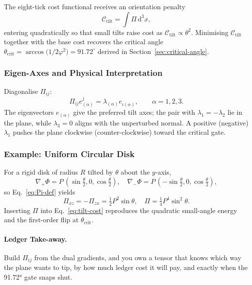 \documentclass[11pt,oneside]{book}
\begin{document}
The eight-tick cost functional receives an orientation penalty
\begin{equation}
   \mathcal C_{\text{tilt}}
   = \int\!\! \Pi\,\mathrm d^{3}x,
   \label{eq:tilt-cost}
\end{equation}
entering quadratically so that small tilts raise cost as
$\mathcal C_{\text{tilt}}\propto\theta^{2}$.
Minimising $\mathcal C_{\text{tilt}}$ together with the base cost
recovers the critical angle
$\theta_{\text{crit}} = \arccos\!\bigl(1/2\varphi^{2}\bigr)
 = 91.72^{\circ}$ derived in
Section~\ref{sec:critical-angle}.

\subsubsection{Eigen-Axes and Physical Interpretation}
\label{ss:Pi-eigen}

Diagonalise $\Pi_{ij}$:
\[
   \Pi_{ij}e^{j}_{(\alpha)} = \lambda_{(\alpha)} e^{\; }_{i(\alpha)},
   \qquad \alpha=1,2,3.
\]
The eigenvectors $e_{(\alpha)}$ give the preferred tilt axes; the pair
with $\lambda_{1}=-\lambda_{2}$ lie in the plane, while
$\lambda_{3}=0$ aligns with the unperturbed normal.
A positive (negative) $\lambda_{1}$ pushes the plane clockwise
(counter-clockwise) toward the critical gate.

\subsubsection{Example: Uniform Circular Disk}
\label{ss:Pi-example-disk}

For a rigid disk of radius $R$ tilted by $\theta$ about the $y$-axis,
\[
   \nabla_{+}\Phi = P\,(\sin\tfrac\theta2,0,\cos\tfrac\theta2),
   \quad
   \nabla_{-}\Phi = P\,(-\sin\tfrac\theta2,0,\cos\tfrac\theta2),
\]
so Eq.~\eqref{eq:Pi-def} yields
\[
   \Pi_{xz} = -\Pi_{zx} = \tfrac12 P^{2}\sin\theta,
   \quad
   \Pi = \tfrac14 P^{4}\sin^{2}\theta.
\]
Inserting $\Pi$ into Eq.~\eqref{eq:tilt-cost} reproduces the quadratic
small-angle energy and the first-order flip at $\theta_{\text{crit}}$.

\paragraph{Ledger Take-away.}
Build $\Pi_{ij}$ from the dual gradients, and you own a tensor that
knows which way the plane wants to tip, by how much ledger cost it
will pay, and exactly when the 91.72° gate snaps shut.

\end{document}
